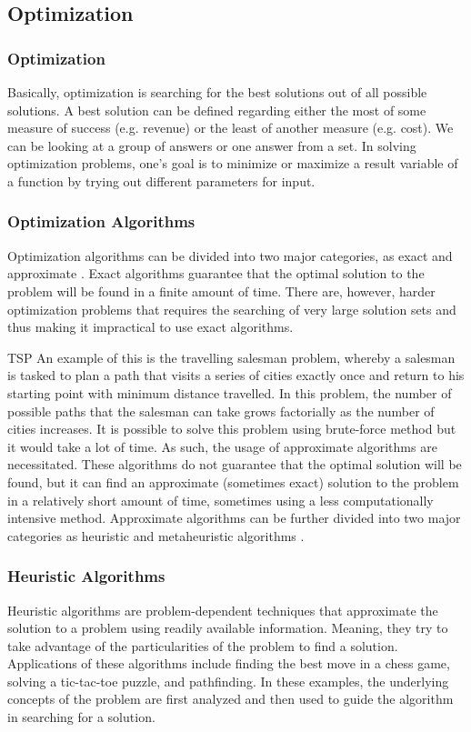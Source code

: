 \documentclass{beamer}
\begin{document}
\subsection{Optimization}

\begin{frame}
\frametitle{Optimization}
Basically, optimization is searching for the best solutions out of all possible solutions. A best solution can be defined regarding either the most of some measure of success (e.g. revenue) or the least of another measure (e.g. cost). We can be looking at a group of answers or one answer from a set. In solving optimization problems, one's goal is to minimize or maximize a result variable of a function by trying out different parameters for input.
\end{frame}

\begin{frame}
\frametitle{Optimization Algorithms}
Optimization algorithms can be divided into two major categories, as exact and approximate \cite{desale_2015}. Exact algorithms guarantee that the optimal solution to the problem will be found in a finite amount of time. There are, however, harder optimization problems that requires the searching of very large solution sets and thus making it impractical to use exact algorithms. 
\end{frame}
\begin{frame}{TSP}
An example of this is the travelling salesman problem, whereby a salesman is tasked to plan a path that visits a series of cities exactly once and return to his starting point with minimum distance travelled. In this problem, the number of possible paths that the salesman can take grows factorially as the number of cities increases. It is possible to solve this problem using brute-force method but it would take a lot of time. As such, the usage of approximate algorithms are necessitated. These algorithms do not guarantee that the optimal solution will be found, but it can find an approximate (sometimes exact) solution to the problem in a relatively short amount of time, sometimes using a less computationally intensive method. Approximate algorithms can be further divided into two major categories as heuristic and metaheuristic algorithms \cite{desale_2015}.
\end{frame}

\begin{frame}
\frametitle{Heuristic Algorithms}
Heuristic algorithms are problem-dependent techniques that approximate the solution to a problem using readily available information. Meaning, they try to take advantage of the particularities of the problem to find a solution. Applications of these algorithms include finding the best move in a chess game, solving a tic-tac-toe puzzle, and pathfinding. In these examples, the underlying concepts of the problem are first analyzed and then used to guide the algorithm in searching for a solution. 
\end{frame}
\end{document}
